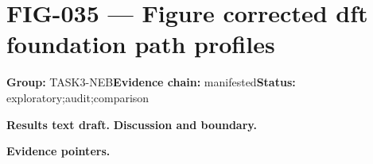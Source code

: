 \clearpage
\section{FIG-035 --- Figure corrected dft foundation path profiles}
\label{figpage:fig-035}
\textbf{Group:} TASK3-NEB\quad \textbf{Evidence chain:} manifested\quad \textbf{Status:} exploratory;audit;comparison

\textbf{Results text draft.} 
\textbf{Discussion and boundary.} 


\textbf{Evidence pointers.}



\vfill
